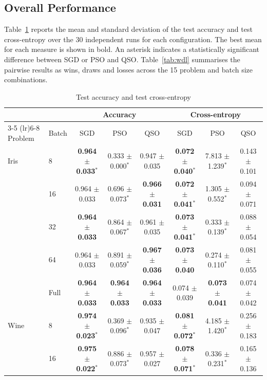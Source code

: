 \documentclass[conference]{IEEEtran}
\begin{document}
\subsection{Overall Performance}
Table~\ref{tab:results} reports the mean and standard deviation of the test 
accuracy and test cross-entropy over the 30 independent runs for each 
configuration. The best mean for each measure is shown in bold. An asterisk 
indicates a statistically significant difference between SGD or PSO and QSO. 
Table~\ref{tab:wdl} summarises the pairwise results as wins, draws and 
losses across the 15 problem and batch size combinations.

\begin{table}[t]
\centering
\caption{Test accuracy and test cross-entropy}
\label{tab:results}
\footnotesize
\setlength{\tabcolsep}{4pt}
\begin{tabular}{llcccccc}
\toprule
 & & \multicolumn{3}{c}{Accuracy} & \multicolumn{3}{c}{Cross-entropy} \\
\cmidrule(lr){3-5} \cmidrule(lr){6-8}
Problem & Batch & SGD & PSO & QSO & SGD & PSO & QSO \\
\midrule
Iris & 8 & \textbf{0.964 $\pm$ 0.033}$^{*}$ & 0.333 $\pm$ 0.000$^{*}$ & 0.947 $\pm$ 0.035 & \textbf{0.072 $\pm$ 0.040}$^{*}$ & 7.813 $\pm$ 1.239$^{*}$ & 0.143 $\pm$ 0.101 \\
 & 16 & 0.964 $\pm$ 0.033 & 0.696 $\pm$ 0.073$^{*}$ & \textbf{0.966 $\pm$ 0.031} & \textbf{0.072 $\pm$ 0.041}$^{*}$ & 1.305 $\pm$ 0.552$^{*}$ & 0.094 $\pm$ 0.071 \\
 & 32 & \textbf{0.964 $\pm$ 0.033} & 0.864 $\pm$ 0.067$^{*}$ & 0.961 $\pm$ 0.035 & \textbf{0.073 $\pm$ 0.041}$^{*}$ & 0.333 $\pm$ 0.139$^{*}$ & 0.088 $\pm$ 0.054 \\
 & 64 & 0.964 $\pm$ 0.033 & 0.891 $\pm$ 0.059$^{*}$ & \textbf{0.967 $\pm$ 0.036} & \textbf{0.073 $\pm$ 0.040} & 0.274 $\pm$ 0.110$^{*}$ & 0.081 $\pm$ 0.055 \\
 & Full & \textbf{0.964 $\pm$ 0.033} & \textbf{0.964 $\pm$ 0.033} & \textbf{0.964 $\pm$ 0.033} & 0.074 $\pm$ 0.039 & \textbf{0.073 $\pm$ 0.041} & 0.074 $\pm$ 0.042 \\
\midrule
Wine & 8 & \textbf{0.974 $\pm$ 0.023}$^{*}$ & 0.369 $\pm$ 0.096$^{*}$ & 0.935 $\pm$ 0.047 & \textbf{0.081 $\pm$ 0.072}$^{*}$ & 4.185 $\pm$ 1.420$^{*}$ & 0.256 $\pm$ 0.183 \\
 & 16 & \textbf{0.975 $\pm$ 0.022}$^{*}$ & 0.886 $\pm$ 0.073$^{*}$ & 0.957 $\pm$ 0.027 & \textbf{0.078 $\pm$ 0.071}$^{*}$ & 0.336 $\pm$ 0.231$^{*}$ & 0.165 $\pm$ 0.136 \\

\end{tabular}
\end{table}
\end{document}
